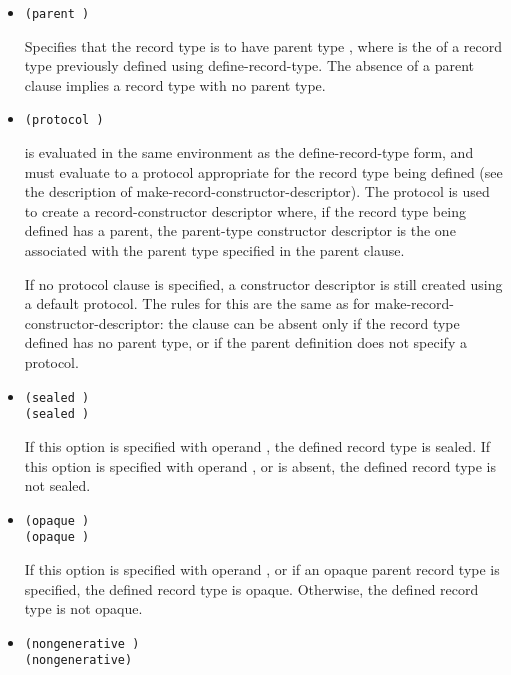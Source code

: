 \begin{entry}{%
}
\begin{itemize}
  The {\cf fields} clause may be absent; this is equivalent to an
  empty {\cf fields} clause.
   
\item {\tt (parent )}
   
 Specifies that the record type is to have parent type
  , where  is the  of a record type previously defined using {\cf
      define-record-type}. The absence of a {\cf parent} clause implies a
    record type with no parent type.
   
\item {\tt (protocol )}
   
   is evaluated in the same environment as the
  define-record-type form, and must evaluate to a protocol appropriate
  for the record type being defined (see the description of
  {\cf make-record-constructor-descriptor}). The protocol is used to
  create a record-constructor descriptor where, if the record type
  being defined has a parent, the parent-type constructor descriptor
  is the one associated with the parent type specified in the {\cf
    parent} clause.
   
  If no {\cf protocol} clause is specified, a constructor descriptor
  is still created using a default protocol. The rules for this are
  the same as for {\cf make-record-constructor-descriptor}: the clause
  can be absent only if the record type defined has no parent type, or
  if the parent definition does not specify a protocol.
   
\item {\tt (sealed \schtrue)}\\
  {\tt (sealed \schfalse)}
   
  If this option is specified with operand \schtrue, the defined
  record type is sealed.  If this option is specified with operand
  \schfalse, or is absent, the defined record type is not sealed.
   
\item {\tt (opaque \schtrue)}\\
  {\tt (opaque \schfalse)}
   
  If this option is specified with operand \schtrue, or if an opaque
  parent record type is specified, the defined record type is opaque.
  Otherwise, the defined record type is not opaque.
   
\item {\tt (nongenerative )}\\
{\tt (nongenerative)}
   

\end{itemize}
\end{entry}
